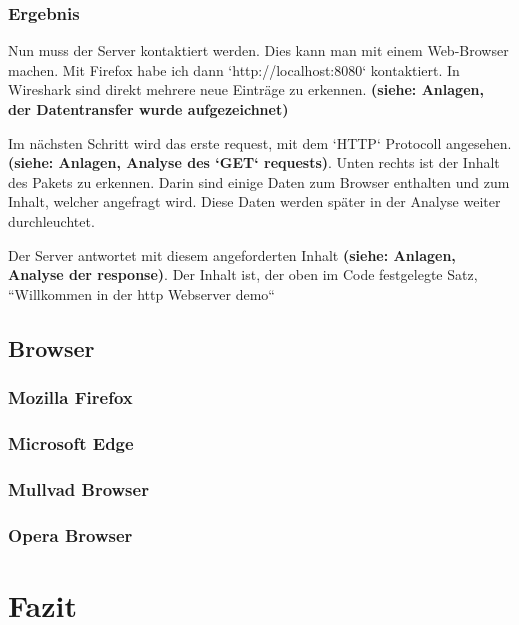 \documentclass[12pt]{article}
\begin{document}
\subsubsection{Ergebnis}

Nun muss der Server kontaktiert werden. Dies kann man mit einem Web-Browser machen. Mit Firefox habe ich dann `http://localhost:8080` kontaktiert. In Wireshark sind direkt mehrere neue Einträge zu erkennen. \textbf{(siehe: Anlagen, der Datentransfer wurde aufgezeichnet)}

Im nächsten Schritt wird das erste request, mit dem `HTTP` Protocoll angesehen. \textbf{(siehe: Anlagen, Analyse des `GET` requests)}. Unten rechts ist der Inhalt des Pakets zu erkennen. Darin sind einige Daten zum Browser enthalten und zum Inhalt, welcher angefragt wird. Diese Daten werden später in der Analyse weiter durchleuchtet.

Der Server antwortet mit diesem angeforderten Inhalt \textbf{(siehe: Anlagen, Analyse der response)}. Der Inhalt ist, der oben im Code festgelegte Satz, ``Willkommen in der http Webserver demo``

\subsection{Browser}
\subsubsection{Mozilla Firefox}
\subsubsection{Microsoft Edge}
 \subsubsection{Mullvad Browser}
\subsubsection{Opera Browser}




 \section{Fazit}


\newpage
 \listoffigures
 \listoftables
\newpage



\newpage
\end{document}
